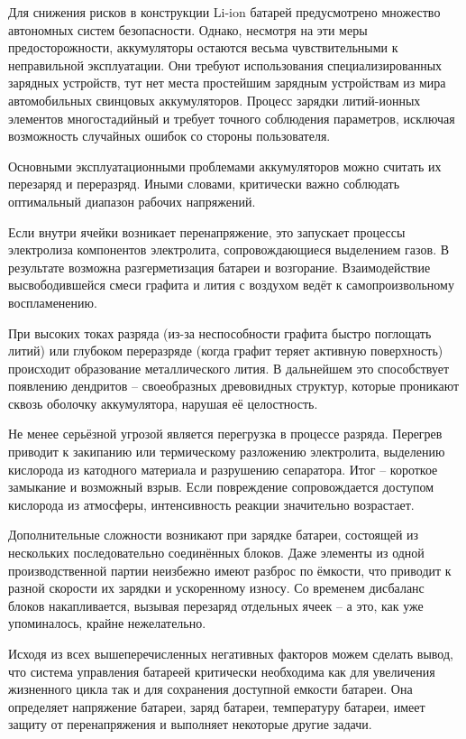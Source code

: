 Для снижения рисков в конструкции Li-ion батарей предусмотрено множество автономных систем безопасности. 
Однако, несмотря на эти меры предосторожности, аккумуляторы остаются весьма чувствительными к неправильной эксплуатации. 
Они требуют использования специализированных зарядных устройств, 
тут нет места простейшим зарядным устройствам из мира автомобильных свинцовых аккумуляторов.
Процесс зарядки литий-ионных элементов многостадийный и требует точного 
соблюдения параметров, исключая возможность случайных ошибок со стороны пользователя.

Основными эксплуатационными проблемами аккумуляторов можно считать их перезаряд и переразряд. 
Иными словами, критически важно соблюдать оптимальный диапазон рабочих напряжений.

Если внутри ячейки возникает перенапряжение, 
это запускает процессы электролиза компонентов электролита, 
сопровождающиеся выделением газов. В результате возможна разгерметизация батареи и возгорание. 
Взаимодействие высвободившейся смеси графита и лития с воздухом ведёт к самопроизвольному воспламенению.

При высоких токах разряда (из-за неспособности графита быстро поглощать литий) 
или глубоком переразряде (когда графит теряет активную поверхность) происходит образование металлического лития. 
В дальнейшем это способствует появлению дендритов – своеобразных древовидных структур, которые проникают сквозь оболочку аккумулятора, нарушая её целостность.

Не менее серьёзной угрозой является перегрузка в процессе разряда. 
Перегрев приводит к закипанию или термическому разложению электролита,
выделению кислорода из катодного материала и разрушению сепаратора. 
Итог – короткое замыкание и возможный взрыв. 
Если повреждение сопровождается доступом кислорода из атмосферы, интенсивность реакции значительно возрастает.

Дополнительные сложности возникают при зарядке батареи, 
состоящей из нескольких последовательно соединённых блоков. 
Даже элементы из одной производственной партии неизбежно имеют разброс по ёмкости, 
что приводит к разной скорости их зарядки и ускоренному износу. 
Со временем дисбаланс блоков накапливается, вызывая перезаряд отдельных ячеек – а это, как уже упоминалось, крайне нежелательно.


Исходя из всех вышеперечисленных негативных факторов можем сделать вывод, 
что система управления батареей критически необходима как для увеличения
жизненного цикла так и для сохранения доступной емкости батареи. Она определяет
напряжение батареи, заряд батареи, температуру батареи, имеет защиту от перенапряжения и выполняет некоторые другие задачи.
